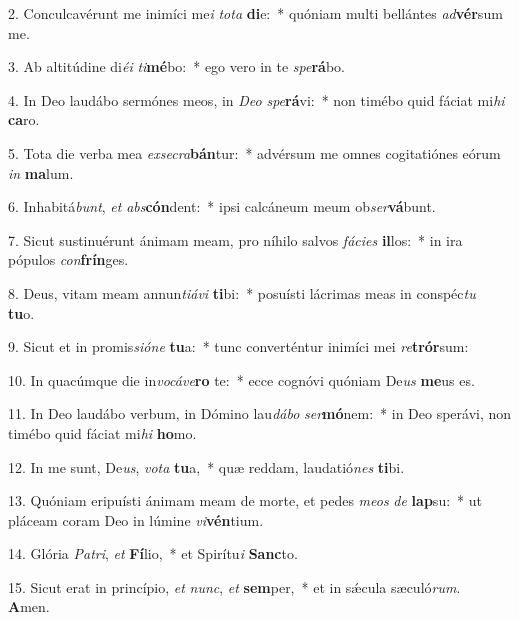 2. Conculcavérunt me inimíci me\textit{i} \textit{to}\textit{ta} \textbf{di}e:~*  quóniam multi bellántes \textit{ad}\textbf{vér}sum me.\

3. Ab altitúdine di\textit{é}\textit{i} \textit{ti}\textbf{mé}bo:~*  ego vero in te \textit{spe}\textbf{rá}bo.\

4. In Deo laudábo sermónes meos, in \textit{De}\textit{o} \textit{spe}\textbf{rá}vi:~*  non timébo quid fáciat mi\textit{hi} \textbf{ca}ro.\

5. Tota die verba mea \textit{ex}\textit{se}\textit{cra}\textbf{bán}tur:~*  advérsum me omnes cogitatiónes eórum \textit{in} \textbf{ma}lum.\

6. Inhabitá\textit{bunt}, \textit{et} \textit{abs}\textbf{cón}dent:~*  ipsi calcáneum meum ob\textit{ser}\textbf{vá}bunt.\

7. Sicut sustinuérunt ánimam meam, pro níhilo salvos \textit{fá}\textit{ci}\textit{es} \textbf{il}los:~*  in ira pópulos \textit{con}\textbf{frín}ges.\

8. Deus, vitam meam annun\textit{ti}\textit{á}\textit{vi} \textbf{ti}bi:~*  posuísti lácrimas meas in conspéc\textit{tu} \textbf{tu}o.\

9. Sicut et in promis\textit{si}\textit{ó}\textit{ne} \textbf{tu}a:~*  tunc converténtur inimíci mei \textit{re}\textbf{trór}sum:\

10. In quacúmque die in\textit{vo}\textit{cá}\textit{ve}\textbf{ro} te:~*  ecce cognóvi quóniam De\textit{us} \textbf{me}us es.\

11. In Deo laudábo verbum, in Dómino lau\textit{dá}\textit{bo} \textit{ser}\textbf{mó}nem:~*  in Deo sperávi, non timébo quid fáciat mi\textit{hi} \textbf{ho}mo.\

12. In me sunt, De\textit{us}, \textit{vo}\textit{ta} \textbf{tu}a,~*  quæ reddam, laudatió\textit{nes} \textbf{ti}bi.\

13. Quóniam eripuísti ánimam meam de morte, et pedes \textit{me}\textit{os} \textit{de} \textbf{lap}su:~*  ut pláceam coram Deo in lúmine \textit{vi}\textbf{vén}tium.\

14. Glória \textit{Pa}\textit{tri}, \textit{et} \textbf{Fí}lio,~*  et Spirítu\textit{i} \textbf{Sanc}to.\

15. Sicut erat in princípio, \textit{et} \textit{nunc}, \textit{et} \textbf{sem}per,~*  et in sǽcula sæculó\textit{rum}. \textbf{A}men.\

